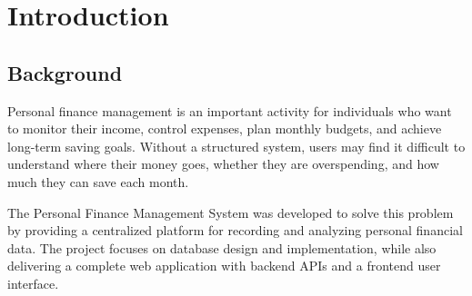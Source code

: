 ﻿\documentclass{article}
\newcommand{\projectname}{Personal Finance Management System}
\newcommand{\dbname}{Personal\_Finance}
\begin{document}
\clearpage
\tableofcontents

\newpage

\begin{abstract}
This report presents the design and implementation of the \projectname, a full-stack database-driven web application for managing personal financial activities. The system supports user management, authentication, bank accounts, income and expense tracking, expense categorization, monthly budget planning, fixed expenses, saving goals, goal contributions, transaction import, financial reports, and administrative functions. The database is implemented in MySQL under the schema name \dbname, while the backend is developed with FastAPI and Python, and the frontend is implemented with Next.js, TypeScript, and Tailwind CSS. The report describes the system requirements, architecture, database design, ERD diagrams, SQL implementation, backend and frontend modules, testing process, security mechanisms, limitations, and future improvements. The project demonstrates how relational database concepts such as primary keys, foreign keys, normalization, constraints, indexes, views, stored procedures, functions, and triggers can be applied to a practical personal finance management system.
\end{abstract}
\section{ Introduction}

\subsection{Background}
Personal finance management is an important activity for individuals who want to monitor their income, control expenses, plan monthly budgets, and achieve long-term saving goals. Without a structured system, users may find it difficult to understand where their money goes, whether they are overspending, and how much they can save each month.

The \projectname{} was developed to solve this problem by providing a centralized platform for recording and analyzing personal financial data. The project focuses on database design and implementation, while also delivering a complete web application with backend APIs and a frontend user interface.
\end{document}
